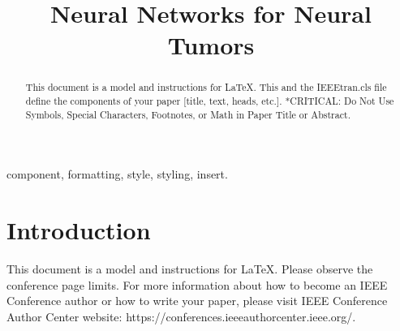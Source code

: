 \documentclass[conference]{IEEEtran}
\begin{document}
\title{Neural Networks for Neural Tumors}

\author{

\and
{}

\and
{}

\and
{}

\and
{}
}

\maketitle

\begin{abstract}
This document is a model and instructions for \LaTeX.
This and the IEEEtran.cls file define the components of your paper [title, text, heads, etc.]. *CRITICAL: Do Not Use Symbols, Special Characters, Footnotes, 
or Math in Paper Title or Abstract.
\end{abstract}

\begin{IEEEkeywords}
component, formatting, style, styling, insert.
\end{IEEEkeywords}

\section{Introduction}
This document is a model and instructions for \LaTeX.
Please observe the conference page limits. For more information about how to become an IEEE Conference author or how to write your paper, please visit   IEEE Conference Author Center website: https://conferences.ieeeauthorcenter.ieee.org/.
\end{document}
